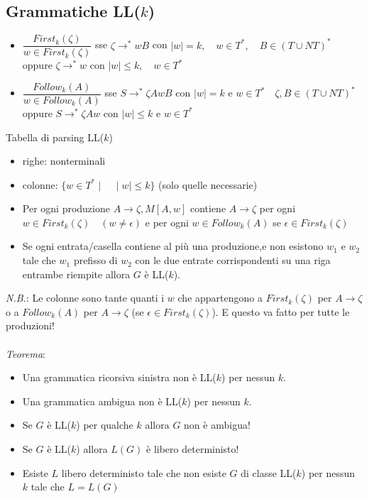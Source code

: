 \documentclass[a4paper,12pt]{article}
\begin{document}
{\subsection{Grammatiche LL($k$)}
\begin{itemize}
  \item $\dfrac{First_k(\zeta)}{w \in First_k(\zeta)}$ sse $\zeta \to^* wB$ con $\mid w \mid = k, \quad w \in T^*, \quad B \in (T \cup NT)^*$ oppure $\zeta \to^* w$ con $\mid w \mid \leq k, \quad w \in T^*$
  \item $\dfrac{Follow_k(A)}{w \in Follow_k(A)}$ sse $S \to^* \zeta A wB$ con $\mid w \mid = k$ e $w \in T^* \quad \zeta, B \in (T \cup NT)^*$ oppure $S \to^* \zeta Aw$ con $\mid w \mid \leq k$ e $w \in T^*$
\end{itemize}
Tabella di parsing LL($k$)
\begin{itemize}
  \item righe: nonterminali
  \item colonne: $\{w \in T^* \mid \quad \mid w \mid \leq k\}$ (solo quelle necessarie)
  \item Per ogni produzione $A \to \zeta, M[A, w]$ contiene $A \to \zeta$ per ogni $w \in First_k(\zeta) \quad (w \neq \epsilon)$ e per ogni $w \in Follow_k(A)$ se $\epsilon \in First_k(\zeta)$
  \item Se ogni entrata/casella contiene al più una produzione,e non esistono $w_1$ e $w_2$ tale che $w_1$ prefisso di $w_2$ con le due entrate corrispondenti su una riga entrambe riempite allora $G$ è LL($k$).
\end{itemize}
\textit{N.B.}: Le colonne sono tante quanti i $w$ che appartengono a $First_k(\zeta) $ per $A \to \zeta$ o a $Follow_k(A)$ per $A \to \zeta$ (se $\epsilon \in First_k(\zeta)$). E questo va fatto per tutte le produzioni! \\
\vspace{1em} \\
\textit{Teorema}:
\begin{itemize}
  \item Una grammatica ricorsiva sinistra non è LL($k$) per nessun $k$.
  \item Una grammatica ambigua non è LL($k$) per nessun $k$.
  \item Se $G$ è LL($k$) per qualche $k$ allora $G$ non è ambigua!
  \item Se $G$ è LL($k$) allora $L(G)$ è libero deterministo!
  \item Esiste $L$ libero deterministo tale che non esiste $G$ di classe LL($k$) per nessun $k$ tale che $L = L(G)$

\end{itemize}}
\end{document}
